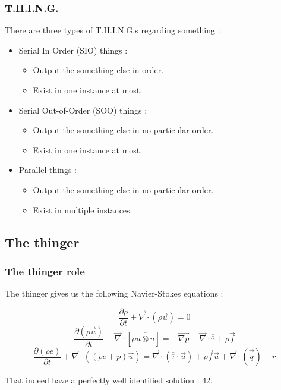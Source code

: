 \documentclass{beamer}
\begin{document}
\begin{frame}
	\frametitle{T.H.I.N.G.}
	There are three types of T.H.I.N.G.s regarding something :
	\begin{itemize}
		\item Serial In Order (SIO) things :
		\begin{itemize}
			\item Output the something else in order.
			\item Exist in one instance at most.
		\end{itemize}
		\item Serial Out-of-Order (SOO) things : 
		\begin{itemize}
			\item Output the something else in no particular order.
			\item Exist in one instance at most.
		\end{itemize}
		\item Parallel things : 
		\begin{itemize}
			\item Output the something else in no particular order.
			\item Exist in multiple instances.
		\end{itemize}
	\end{itemize}
\end{frame}

\subsection{The thinger}

	\begin{frame}
		\frametitle{The thinger role}
		The thinger gives us the following Navier-Stokes equations :
		
		\begin{equation}
		\frac{\partial \rho}{\partial t} + \overrightarrow{\nabla}\cdot(\rho\overrightarrow{u})=0 \end{equation}
		\begin{equation}
		\frac{\partial(\rho \overrightarrow{u})}{\partial t} + \overrightarrow{\nabla}\cdot[\rho\overline{\overline{u\otimes u}}] = -\overrightarrow{\nabla p} + \overrightarrow{\nabla}\cdot\overline{\overline{\tau}} + \rho\overrightarrow{f} \end{equation}
		\begin{equation}
		\frac{\partial(\rho e)}{\partial t} + \overrightarrow{\nabla}\cdot((\rho e + p)\overrightarrow{u}) = \overrightarrow{\nabla}\cdot(\overline{\overline{\tau}}\cdot\overrightarrow{u}) + \rho\overrightarrow{f}\overrightarrow{u} + \overrightarrow{\nabla}\cdot(\overrightarrow{\dot{q}})+r \end{equation}
		
		That indeed have a perfectly well identified solution : 42.
		
	\end{frame}
\end{document}
